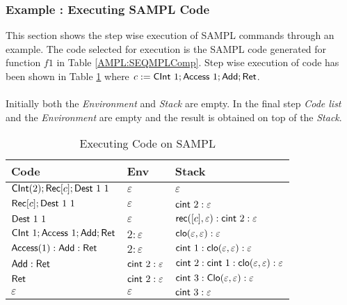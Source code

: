 \documentclass[11pt]{article}
\newcommand{\<}{\langle}
\renewcommand{\>}{\rangle}
\begin{document}
\subsubsection {Example : Executing SAMPL Code}
This section shows the step wise execution of SAMPL commands through an example. The code selected for execution is the SAMPL code generated for function $f1$ in Table \ref {AMPL:SEQMPLComp}. Step wise execution of code has been shown in Table \ref {AMPL:ExecSeqTable} where $c := {\sf CInt}~1;{\sf Access}~1; {\sf Add}; {\sf Ret}$.
~~\\~~\\
Initially both the {\em Environment} and {\em Stack} are empty.
In the final step {\em Code list} and the {\em Environment} are empty and the result is obtained on top of the {\em Stack}.


  \begin{table}[!h]
  \begin{center}
    \begin{tabular}{|l|l|l|}
    \hline
   Code                          & Env                     & Stack                                                    \\ \hline
     ${\sf CInt}(2) ; {\sf Rec}[c];{\sf Dest}~1~1$      & $\varepsilon$   & $\varepsilon$                                    \\ \hline
    ${\sf Rec}[c];{\sf Dest}~1~1$             & $\varepsilon$  & ${\sf cint}~2:\varepsilon$  \\ \hline
     ${\sf Dest}~1 ~1$     & $\varepsilon$   & ${\sf rec}([c],\varepsilon): {\sf cint}~2:\varepsilon$ \\ \hline
     ${\sf CInt}~1; {\sf Access}~1; {\sf Add}; {\sf Ret}$ & $2:\varepsilon$ & ${\sf clo}(\varepsilon,\varepsilon):\varepsilon$                                   \\ \hline
     ${\sf Access}(1): {\sf Add}: {\sf Ret}$           & $2:\varepsilon$ & ${\sf cint}~1:{\sf clo}(\varepsilon,\varepsilon):\varepsilon$                                                        \\ \hline
    ${\sf Add}: {\sf Ret}$                  & ${\sf cint}~2:\varepsilon$ & ${\sf cint}~2:{\sf cint}~1:{\sf clo}(\varepsilon,\varepsilon):\varepsilon$                                                     \\ \hline
      ${\sf Ret}$                        & ${\sf cint}~2:\varepsilon$ & ${\sf cint}~3:{\sf Clo}(\varepsilon,\varepsilon):\varepsilon$                                                       \\ \hline
    $\varepsilon$                     & $\varepsilon$   & ${\sf cint}~3:\varepsilon$                                                        \\ \hline
    \end{tabular}
    \caption{Executing Code on SAMPL}
    \label{AMPL:ExecSeqTable}
    \end{center}
    \end{table}
\end{document}
